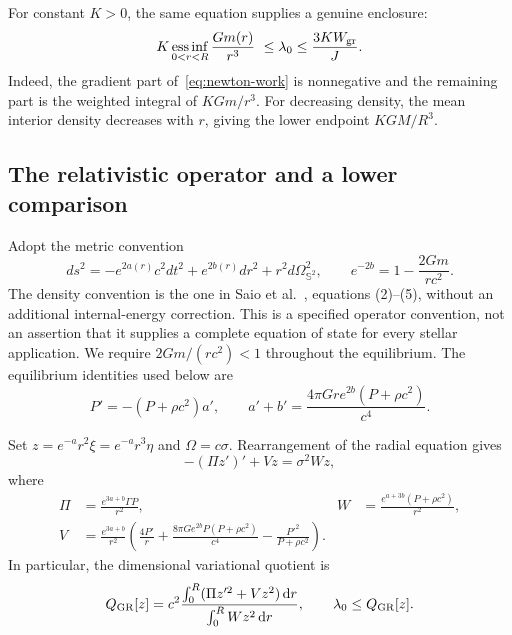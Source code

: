 \documentclass[11pt,letterpaper]{article}
\newcommand{\essinf}{\operatorname*{ess\,inf}}
\newcommand{\dd}{\,\mathrm d}
\theoremstyle{definition}
\numberwithin{equation}{section}
\begin{document}
For constant $K>0$, the same equation supplies a genuine enclosure:
\begin{equation}
 K\essinf_{0<r<R}\frac{Gm(r)}{r^3}
 \ \le\lambda_0\le\frac{3K W_{\rm gr}}{J}.
 \label{eq:newton-enclosure}
\end{equation}
Indeed, the gradient part of~\eqref{eq:newton-work} is nonnegative and the
remaining part is the weighted integral of $KGm/r^3$. For decreasing
density, the mean interior density decreases with $r$, giving the lower
endpoint $KGM/R^3$.

\subsection{The relativistic operator and a lower comparison}

Adopt the metric convention
\begin{equation}
 ds^2=-e^{2a(r)}c^2dt^2+e^{2b(r)}dr^2+r^2d\Omega_{\mathbb S^2}^2,
 \qquad e^{-2b}=1-\frac{2Gm}{rc^2}.
\end{equation}
The density convention is the one in Saio et al.~\cite{saio}, equations
(2)--(5), without an additional internal-energy correction. This is a
specified operator convention, not an assertion that it supplies a complete
equation of state for every stellar application. We require $2Gm/(rc^2)<1$
throughout the equilibrium. The equilibrium identities used below are
\begin{equation}
 P'=-(P+\rho c^2)a',\qquad
 a'+b'=\frac{4\pi G r e^{2b}(P+\rho c^2)}{c^4}.
 \label{eq:tov-identities}
\end{equation}

Set $z=e^{-a}r^2\xi=e^{-a}r^3\eta$ and $\Omega=c\sigma$. Rearrangement
of the radial equation gives
\begin{equation}
 -(\Pi z')'+Vz=\sigma^2Wz,
 \label{eq:gr-sl}
\end{equation}
where
\begin{align}
 \Pi&=\frac{e^{3a+b}\Gamma P}{r^2},
 &W&=\frac{e^{a+3b}(P+\rho c^2)}{r^2},\label{eq:gr-coeff}\\
 V&=\frac{e^{3a+b}}{r^2}
 \left(\frac{4P'}r+
 \frac{8\pi G e^{2b}P(P+\rho c^2)}{c^4}
 -\frac{P'^2}{P+\rho c^2}\right).
 \label{eq:gr-potential}
\end{align}
In particular, the dimensional variational quotient is
\begin{equation}
 Q_{\rm GR}[z]
 =c^2\frac{\int_0^R(\Pi z'^2+Vz^2)\dd r}
               {\int_0^R Wz^2\dd r},\qquad
 \lambda_0\le Q_{\rm GR}[z].
 \label{eq:gr-rayleigh}
\end{equation}
\end{document}
